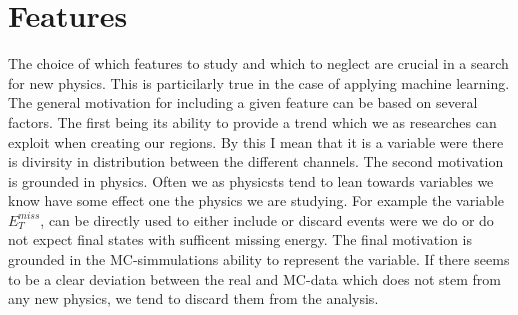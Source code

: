 \section{Features}
The choice of which features to study and which to neglect are crucial in a search for new physics. This is particilarly true 
in the case of applying machine learning. The general motivation for including a given feature can be based on several factors. 
The first being its ability to provide a trend which we as researches can exploit when creating our regions. By this I mean
that it is a variable were there is divirsity in distribution between the different channels. The second motivation is grounded in 
physics. Often we as physicsts tend to lean towards variables we know have some effect one the physics we are studying. For 
example the variable $E_T^{miss}$, can be directly used to either include or discard events were we do or do not expect final states
with sufficent missing energy. The final motivation is grounded in the \ac{MC}-simmulations ability to represent the variable.
If there seems to be a clear deviation between the real and \ac{MC}-data which does not stem from any new physics, we tend to discard
them from the analysis.